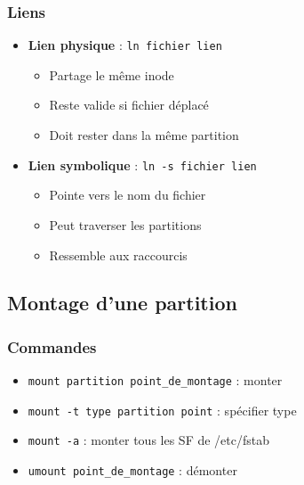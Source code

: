 \documentclass[12pt,a4paper]{article}
\begin{document}

\subsubsection{Liens}
\begin{itemize}
    \item \textbf{Lien physique} : \texttt{ln fichier lien}
    \begin{itemize}
        \item Partage le m\^eme inode %
        \item Reste valide si fichier d\'eplac\'e %
        \item Doit rester dans la m\^eme partition %
    \end{itemize}
    \item \textbf{Lien symbolique} : \texttt{ln -s fichier lien}
    \begin{itemize}
        \item Pointe vers le nom du fichier %
        \item Peut traverser les partitions %
        \item Ressemble aux raccourcis %
    \end{itemize}
\end{itemize}

\subsection{Montage d'une partition}

\subsubsection{Commandes}
\begin{itemize}
    \item \texttt{mount partition point\_de\_montage} : monter
    \item \texttt{mount -t type partition point} : sp\'ecifier type
    \item \texttt{mount -a} : monter tous les SF de /etc/fstab
    \item \texttt{umount point\_de\_montage} : d\'emonter
\end{itemize}
\end{document}
